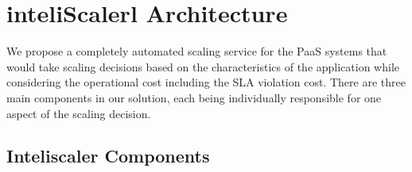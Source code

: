 \section{inteliScalerl Architecture}
We propose a completely automated scaling service for the PaaS systems that would take scaling decisions based on the characteristics of the application while considering the operational cost including the SLA violation cost. There are three main components in our solution, each being individually responsible for one aspect of the scaling decision.\\

\subsection{Inteliscaler Components}